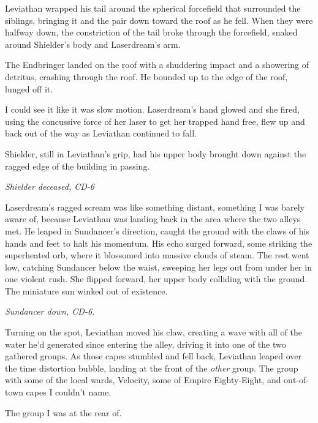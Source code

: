 Leviathan wrapped his tail around the spherical forcefield that surrounded the siblings, bringing it and the pair down toward the roof as he fell.  When they were halfway down, the constriction of the tail broke through the forcefield, snaked around Shielder's body and Laserdream's arm.



The Endbringer landed on the roof with a shuddering impact and a showering of detritus, crashing through the roof.  He bounded up to the edge of the roof, lunged off it.



I could see it like it was slow motion.  Laserdream's hand glowed and she fired, using the concussive force of her laser to get her trapped hand free, flew up and back out of the way as Leviathan continued to fall.



Shielder, still in Leviathan's grip, had his upper body brought down against the ragged edge of the building in passing.



\emph{Shielder deceased, CD-6}



Laserdream's ragged scream was like something distant, something I was barely aware of, because Leviathan was landing back in the area where the two alleys met.  He leaped in Sundancer's direction, caught the ground with the claws of his hands and feet to halt his momentum.  His echo surged forward, some striking the superheated orb, where it blossomed into massive clouds of steam.  The rest went low, catching Sundancer below the waist, sweeping her legs out from under her in one violent rush.  She flipped forward, her upper body colliding with the ground.  The miniature sun winked out of existence.



\emph{Sundancer down, CD-6.}



Turning on the spot, Leviathan moved his claw, creating a wave with all of the water he'd generated since entering the alley, driving it into one of the two gathered groups.  As those capes stumbled and fell back, Leviathan leaped over the time distortion bubble, landing at the front of the \emph{other }group.  The group with some of the local wards, Velocity, some of Empire Eighty-Eight, and out-of-town capes I couldn't name.



The group I was at the rear of.



